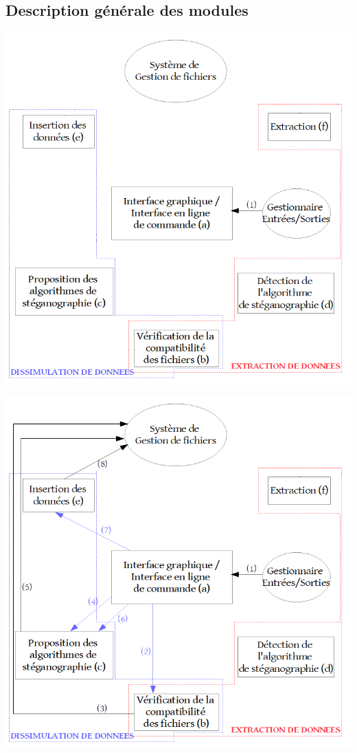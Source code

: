 \documentclass{beamer}
\begin{document}
  \subsection{Description générale des modules}
  
  \begin{frame}
  \hspace{1.5cm}
  \includegraphics[scale=0.35]{pictures/organigramme_vide.png}
  \end{frame}
  
  \begin{frame}
  \hspace{1.5cm}
  \includegraphics[scale=0.35]{pictures/organigramme_insertion.png}
  \end{frame}
  
\end{document}

